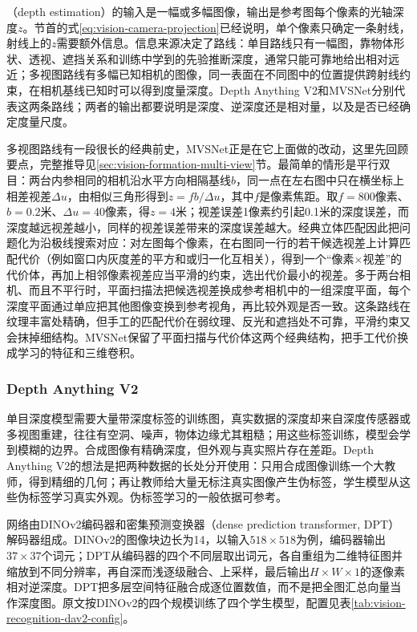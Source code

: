 （depth estimation）的输入是一幅或多幅图像，输出是参考图每个像素的光轴深度$z$。节首的式\eqref{eq:vision-camera-projection}已经说明，单个像素只确定一条射线，射线上的$z$需要额外信息。信息来源决定了路线：单目路线只有一幅图，靠物体形状、透视、遮挡关系和训练中学到的先验推断深度，通常只能可靠地给出相对远近；多视图路线有多幅已知相机的图像，同一表面在不同图中的位置提供跨射线约束，在相机基线已知时可以得到度量深度。Depth Anything V2和MVSNet分别代表这两条路线；两者的输出都要说明是深度、逆深度还是相对量，以及是否已经确定度量尺度。

多视图路线有一段很长的经典前史，MVSNet正是在它上面做的改动，这里先回顾要点，完整推导见\ref{sec:vision-formation-multi-view}节。最简单的情形是平行双目：两台内参相同的相机沿水平方向相隔基线$b$，同一点在左右图中只在横坐标上相差视差$\Delta u$，由相似三角形得到$z=fb/\Delta u$，其中$f$是像素焦距。取$f=800$像素、$b=0.2$米、$\Delta u=40$像素，得$z=4$米；视差误差1像素约引起0.1米的深度误差，而深度越远视差越小，同样的视差误差带来的深度误差越大。经典立体匹配因此把问题化为沿极线搜索对应：对左图每个像素，在右图同一行的若干候选视差上计算匹配代价（例如窗口内灰度差的平方和或归一化互相关），得到一个“像素$\times$视差”的代价体，再加上相邻像素视差应当平滑的约束，选出代价最小的视差。多于两台相机、而且不平行时，平面扫描法把候选视差换成参考相机中的一组深度平面，每个深度平面通过单应把其他图像变换到参考视角，再比较外观是否一致。这条路线在纹理丰富处精确，但手工的匹配代价在弱纹理、反光和遮挡处不可靠，平滑约束又会抹掉细结构。MVSNet保留了平面扫描与代价体这两个经典结构，把手工代价换成学习的特征和三维卷积。

\subsubsection{Depth Anything V2}
\label{sec:vision-recognition-depth-anything}

单目深度模型需要大量带深度标签的训练图，真实数据的深度却来自深度传感器或多视图重建，往往有空洞、噪声，物体边缘尤其粗糙；用这些标签训练，模型会学到模糊的边界。合成图像有精确深度，但外观与真实照片存在差距。Depth Anything V2的想法是把两种数据的长处分开使用：只用合成图像训练一个大教师，得到精细的几何；再让教师给大量无标注真实图像产生伪标签，学生模型从这些伪标签学习真实外观。伪标签学习的一般依据可参考。

网络由DINOv2编码器和密集预测变换器（dense prediction transformer, DPT）解码器组成。DINOv2的图像块边长为14，以输入$518\times518$为例，编码器输出$37\times37$个词元；DPT从编码器的四个不同层取出词元，各自重组为二维特征图并缩放到不同分辨率，再自深而浅逐级融合、上采样，最后输出$H\times W\times1$的逐像素相对逆深度。DPT把多层空间特征融合成逐位置数值，而不是把全图汇总向量当作深度图。原文按DINOv2的四个规模训练了四个学生模型，配置见表\ref{tab:vision-recognition-dav2-config}。

